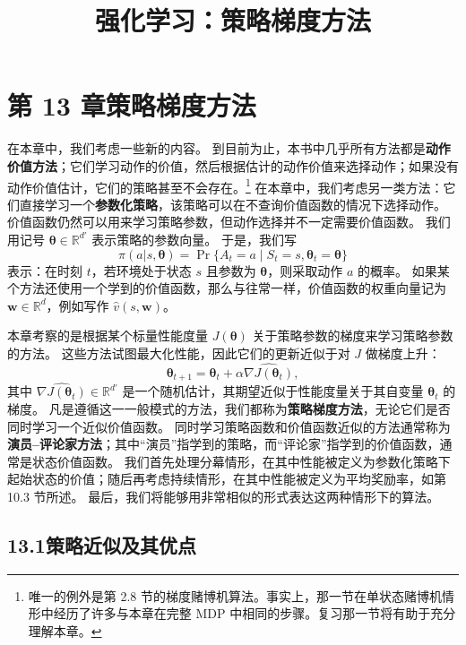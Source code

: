 \documentclass[UTF8, 12pt, fontset=fandol, oneside]{ctexart}
\title{强化学习：策略梯度方法}
\author{}
\date{}
\begin{document}
\maketitle

\section*{第 13 章\quad 策略梯度方法}

在本章中，我们考虑一些新的内容。
到目前为止，本书中几乎所有方法都是\textbf{动作价值方法}；它们学习动作的价值，然后根据估计的动作价值来选择动作；如果没有动作价值估计，它们的策略甚至不会存在。\footnote{唯一的例外是第 2.8 节的梯度赌博机算法。事实上，那一节在单状态赌博机情形中经历了许多与本章在完整 MDP 中相同的步骤。复习那一节将有助于充分理解本章。}
在本章中，我们考虑另一类方法：它们直接学习一个\textbf{参数化策略}，该策略可以在不查询价值函数的情况下选择动作。
价值函数仍然可以用来学习策略参数，但动作选择并不一定需要价值函数。
我们用记号 $\boldsymbol{\theta}\in\mathbb{R}^{d'}$ 表示策略的参数向量。
于是，我们写
\[
\pi(a|s,\boldsymbol{\theta})=\Pr\{A_t=a\mid S_t=s,\boldsymbol{\theta}_t=\boldsymbol{\theta}\}
\]
表示：在时刻 $t$，若环境处于状态 $s$ 且参数为 $\boldsymbol{\theta}$，则采取动作 $a$ 的概率。
如果某个方法还使用一个学到的价值函数，那么与往常一样，价值函数的权重向量记为 $\mathbf{w}\in\mathbb{R}^d$，例如写作 $\hat v(s,\mathbf{w})$。

本章考察的是根据某个标量性能度量 $J(\boldsymbol{\theta})$ 关于策略参数的梯度来学习策略参数的方法。
这些方法试图最大化性能，因此它们的更新近似于对 $J$ 做梯度上升：
\begin{equation}
\boldsymbol{\theta}_{t+1}=\boldsymbol{\theta}_t+\alpha \widehat{\nabla J(\boldsymbol{\theta}_t)},
\tag{13.1}
\end{equation}
其中 $\widehat{\nabla J(\boldsymbol{\theta}_t)}\in\mathbb{R}^{d'}$ 是一个随机估计，其期望近似于性能度量关于其自变量 $\boldsymbol{\theta}_t$ 的梯度。
凡是遵循这一一般模式的方法，我们都称为\textbf{策略梯度方法}，无论它们是否同时学习一个近似价值函数。
同时学习策略函数和价值函数近似的方法通常称为\textbf{演员--评论家方法}；其中“演员”指学到的策略，而“评论家”指学到的价值函数，通常是状态价值函数。
我们首先处理分幕情形，在其中性能被定义为参数化策略下起始状态的价值；随后再考虑持续情形，在其中性能被定义为平均奖励率，如第 10.3 节所述。
最后，我们将能够用非常相似的形式表达这两种情形下的算法。

\subsection*{13.1\quad 策略近似及其优点}
\end{document}
